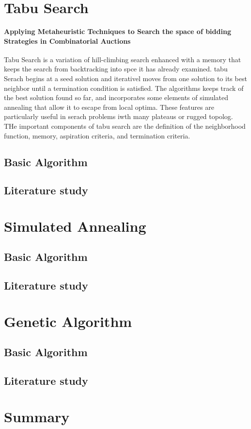 \section{Tabu Search}

\paragraph{Applying Metaheuristic Techniques to Search the space of bidding Strategies in Combinatorial Auctions}
Tabu Search is a variation of hill-climbing search enhanced with a memory that keeps the search from backtracking into spce it has already examined. tabu Serach begins at a seed solution and iterativel moves from one solution to its best neighbor until a termination condition is satisfied. The algorithms keeps track of the best solution found so far, and incorporates some elements of simulated annealing that allow it to escape from local optima. These features are particularly useful in serach problems iwth many plateaus  or rugged topolog. THe important components of tabu search are the definition of the neighborhood function, memory, aspiration criteria, and termination criteria.
\subsection{Basic Algorithm}

\subsection{Literature study}

\section{Simulated Annealing}

\subsection{Basic Algorithm}

\subsection{Literature study}

\section{Genetic Algorithm}

\subsection{Basic Algorithm}

\subsection{Literature study}
\section {Summary}
